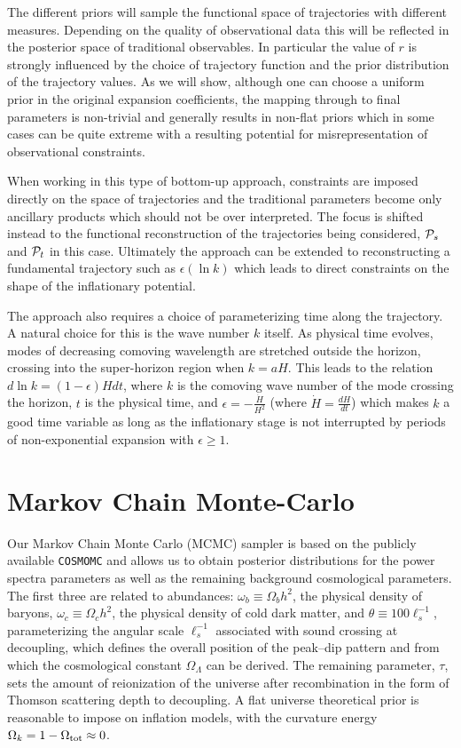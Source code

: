 \documentclass[a4paper,11pt]{article}
\begin{document}
The different priors will sample the functional space of trajectories
with different measures. Depending on the quality of observational
data this will be reflected in the posterior space of traditional
observables. In particular the value of $r$ is strongly influenced by
the choice of trajectory function and the prior distribution of the
trajectory values. As we will show, although one can choose a uniform
prior in the original expansion coefficients, the mapping through to
final parameters is non-trivial and generally results in non-flat
priors which in some cases can be quite extreme \cite{Peiris:2006sj,
  Peiris:2006ug} with a resulting potential for misrepresentation of
observational constraints.

When working in this type of bottom-up approach, constraints are
imposed directly on the space of trajectories and the traditional
parameters become only ancillary products which should not be over
interpreted. The focus is shifted instead to the functional
reconstruction of the trajectories being considered, ${\cal P}_s$ and
${\cal P}_t$ in this case. Ultimately the approach can be extended to
reconstructing a fundamental trajectory such as $\epsilon(\ln k)$
which leads to direct constraints on the shape of the inflationary
potential.

The approach also requires a choice of parameterizing time along the
trajectory. A natural choice for this is the wave number
$k$ itself. As physical time evolves, modes of decreasing comoving
wavelength are stretched outside the horizon, crossing into the
super-horizon region when $k=aH$. This leads to the relation $d\ln k =
(1-\epsilon) H dt$, where $k$ is the comoving wave number of the mode
crossing the horizon, $t$ is the physical time, and
$\epsilon=-\frac{\dot{H}}{H^2}$ (where $\dot{H}=\frac{dH}{dt}$) which
makes $k$ a good time variable as long as the inflationary stage is
not interrupted by periods of non-exponential expansion with
$\epsilon\ge1$.

\section{Markov Chain Monte-Carlo}
Our Markov Chain Monte Carlo (MCMC) sampler is based on the publicly
available {\tt COSMOMC} \cite{Lewis:2002ah} and allows us to obtain
posterior distributions for the power spectra parameters as well as
the remaining background cosmological parameters. The first three are
related to abundances: $\omega_b\equiv\Omega_bh^2$, the physical
density of baryons, $\omega_c\equiv\Omega_ch^2$, the physical density
of cold dark matter, and $\theta\equiv100\ell_s^{-1}$, parameterizing
the angular scale $\ell_s^{-1}$ associated with sound crossing at
decoupling, which defines the overall position of the peak--dip
pattern and from which the cosmological constant $\Omega_\Lambda$ can
be derived. The remaining parameter, $\tau$, sets the amount of
reionization of the universe after recombination in the form of
Thomson scattering depth to decoupling. A flat universe theoretical
prior is reasonable to impose on inflation models, with the curvature
energy $\Omega_k = 1-\Omega_{\rm tot} \approx 0$.
\end{document}
